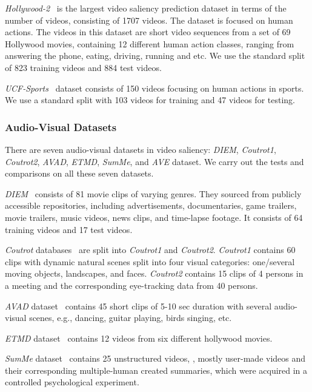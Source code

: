 \documentclass[letterpaper, 10 pt, conference]{ieeeconf}  \usepackage{times}
\begin{document}
\emph{Hollywood-2}~\cite{marszalek2009actions} is the largest video saliency prediction dataset in terms of the number of videos, consisting of 1707 videos. The dataset is focused on human actions. The videos in this dataset are short video sequences from a set of 69 Hollywood movies, containing 12 different human action classes, ranging from answering the phone, eating, driving, running and etc. We use the standard split of 823  training videos and 884 test videos.

\emph{UCF-Sports}~\cite{rodriguez2008action} dataset consists of 150 videos focusing on human actions in sports. We use a standard split with 103 videos for training and 47 videos for testing. 

\subsubsection{Audio-Visual Datasets}
There are seven audio-visual datasets in video saliency: \emph{DIEM}, \emph{Coutrot1}, \emph{Coutrot2}, \emph{AVAD}, \emph{ETMD}, \emph{SumMe}, and \emph{AVE} dataset. We carry out the tests and comparisons on all these seven datasets. 

\emph{DIEM}~\cite{mital2011clustering} consists of 81 movie clips of varying genres. They sourced from publicly accessible repositories, including advertisements, documentaries, game trailers, movie trailers, music videos, news clips, and time-lapse footage. It consists of 64 training videos and 17 test videos.

\emph{Coutrot} databases~\cite{coutrot2014saliency,coutrot2016multimodal} are split into \emph{Coutrot1} and \emph{Coutrot2}. \emph{Coutrot1} contains 60 clips with dynamic natural scenes split into four visual categories: one/several moving objects, landscapes, and faces. \emph{Coutrot2} contains 15 clips of 4 persons in a meeting and the corresponding eye-tracking data from 40 persons. 

\emph{AVAD} dataset~\cite{min2016fixation} contains 45 short clips of 5-10 sec duration with several audio-visual scenes, e.g., dancing, guitar playing, birds singing, etc. 

\emph{ETMD} dataset~\cite{koutras2015perceptually} contains 12 videos from six different hollywood movies.

\emph{SumMe} dataset~\cite{gygli2014creating} contains 25 unstructured videos, \ie, mostly user-made videos and their corresponding multiple-human created summaries, which were acquired in a controlled psychological experiment.
\end{document}
